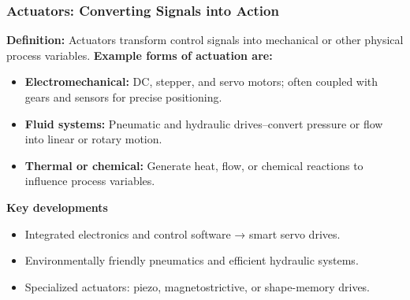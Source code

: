 \begin{frame}
	\frametitle{Actuators: Converting Signals into Action}
  \textbf{Definition:}  
  Actuators transform control signals into mechanical or other physical process variables.
  \vspace{1mm}
  \textbf{Example forms of actuation are:}
  \begin{itemize}
    \item \textbf{Electromechanical:} DC, stepper, and servo motors; often coupled with gears and sensors for precise positioning.
    \item \textbf{Fluid systems:} Pneumatic and hydraulic drives--convert pressure or flow into linear or rotary motion.
    \item \textbf{Thermal or chemical:} Generate heat, flow, or chemical reactions to influence process variables.
  \end{itemize}
  \vspace{2mm}
  \textbf{Key developments}
  \begin{itemize}
    \item Integrated electronics and control software → smart servo drives.
    \item Environmentally friendly pneumatics and efficient hydraulic systems.
    \item Specialized actuators: piezo, magnetostrictive, or shape-memory drives.
  \end{itemize}
\end{frame}
